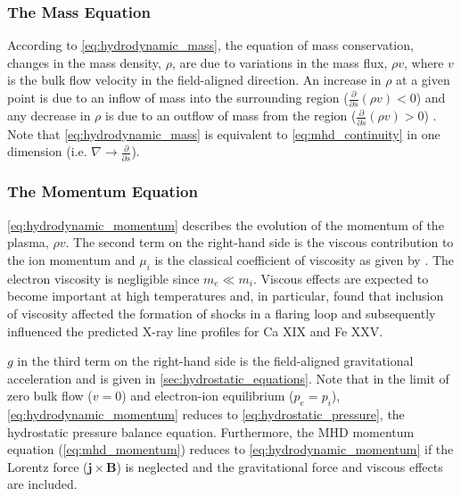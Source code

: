 \subsubsection{The Mass Equation}\label{sec:hydrodynamic-mass}

According to \autoref{eq:hydrodynamic_mass}, the equation of mass conservation, changes in the mass density, $\rho$, are due to variations in the mass flux, $\rho v$, where $v$ is the bulk flow velocity in the field-aligned direction. An increase in $\rho$ at a given point is due to an inflow of mass into the surrounding region ($\frac{\partial}{\partial s}(\rho v) < 0$) and any decrease in $\rho$ is due to an outflow of mass from the region ($\frac{\partial}{\partial s}(\rho v) > 0$) \citep{priest_magnetohydrodynamics_2014}. Note that \autoref{eq:hydrodynamic_mass} is equivalent to \autoref{eq:mhd_continuity} in one dimension (i.e. $\nabla\to\frac{\partial}{\partial s}$).

\subsubsection{The Momentum Equation}\label{sec:hydrodynamic-momentum}

\autoref{eq:hydrodynamic_momentum} describes the evolution of the momentum of the plasma, $\rho v$. The second term on the right-hand side is the viscous contribution to the ion momentum and $\mu_i$ is the classical coefficient of viscosity as given by \citet{spitzer_physics_1962}. The electron viscosity is negligible since $m_e\ll m_i$. Viscous effects are expected to become important at high temperatures \citep{bradshaw_what_2011} and, in particular, \citet{peres_importance_1993} found that inclusion of viscosity affected the formation of shocks in a flaring loop and subsequently influenced the predicted X-ray line profiles for Ca XIX and Fe XXV. 

$g$ in the third term on the right-hand side is the field-aligned gravitational acceleration and is given in \autoref{sec:hydrostatic_equations}. Note that in the limit of zero bulk flow ($v=0$) and electron-ion equilibrium ($p_e=p_i$), \autoref{eq:hydrodynamic_momentum} reduces to \autoref{eq:hydrostatic_pressure}, the hydrostatic pressure balance equation. Furthermore, the MHD momentum equation (\autoref{eq:mhd_momentum}) reduces to \autoref{eq:hydrodynamic_momentum} if the Lorentz force ($\mathbf{j}\times\mathbf{B}$) is neglected and the gravitational force and viscous effects are included.

